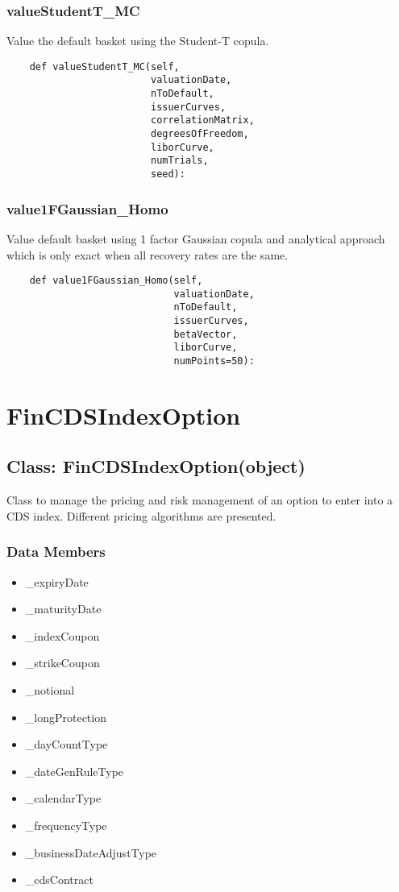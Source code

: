 \documentclass[twoside,11pt]{book}
\begin{document}
\subsubsection*{{\bf valueStudentT\_MC}}
Value the default basket using the Student-T copula.  

\begin{lstlisting}
    def valueStudentT_MC(self,
                         valuationDate,
                         nToDefault,
                         issuerCurves,
                         correlationMatrix,
                         degreesOfFreedom,
                         liborCurve,
                         numTrials,
                         seed):
\end{lstlisting}

\subsubsection*{{\bf value1FGaussian\_Homo}}
Value default basket using 1 factor Gaussian copula and analytical approach which is only exact when all recovery rates are the same.  

\begin{lstlisting}
    def value1FGaussian_Homo(self,
                             valuationDate,
                             nToDefault,
                             issuerCurves,
                             betaVector,
                             liborCurve,
                             numPoints=50):
\end{lstlisting}

\newpage
\section{FinCDSIndexOption}

\subsection*{Class: FinCDSIndexOption(object)}
Class to manage the pricing and risk management of an option to enter into a CDS index. Different pricing algorithms are presented. 

\subsubsection*{Data Members}
\begin{itemize}
\item{\_expiryDate}
\item{\_maturityDate}
\item{\_indexCoupon}
\item{\_strikeCoupon}
\item{\_notional}
\item{\_longProtection}
\item{\_dayCountType}
\item{\_dateGenRuleType}
\item{\_calendarType}
\item{\_frequencyType}
\item{\_businessDateAdjustType}
\item{\_cdsContract}
\end{itemize}
\end{document}
